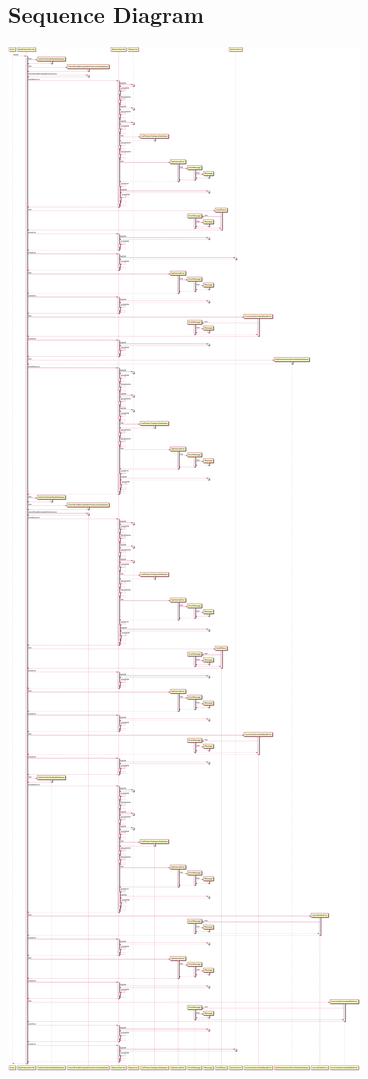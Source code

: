 \subsection{Sequence Diagram}

\includegraphics[width=\textwidth,height=\textheight,keepaspectratio]{Schemas/BuyProductServlet_doGet.svg.pdf}

